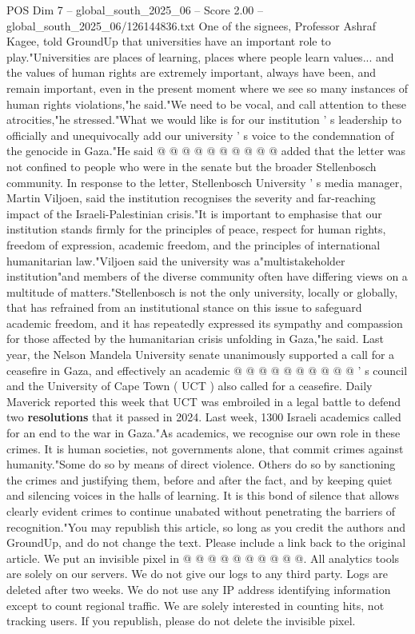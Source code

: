 \begin{textsample}{POS Dim 7 – global\_south\_2025\_06 – Score 2.00 – global\_south\_2025\_06/126144836.txt}
One of the signees, Professor Ashraf Kagee, told GroundUp that universities have an important role to play."Universities are places of learning, places where people learn values... and the values of human rights are extremely important, always have been, and remain important, even in the present moment where we see so many instances of human rights violations,"he said."We need to be vocal, and call attention to these atrocities,"he stressed."What we would like is for our institution ' s leadership to officially and unequivocally add our university ' s voice to the condemnation of the genocide in Gaza."He said @ @ @ @ @ @ @ @ @ @ added that the letter was not confined to people who were in the senate but the broader Stellenbosch community.
In response to the letter, Stellenbosch University ' s media manager, Martin Viljoen, said the institution recognises the severity and far-reaching impact of the Israeli-Palestinian crisis."It is important to emphasise that our institution stands firmly for the principles of peace, respect for human rights, freedom of expression, academic freedom, and the principles of international humanitarian law."Viljoen said the university was a"multistakeholder institution"and members of the diverse community often have differing views on a multitude of matters."Stellenbosch is not the only university, locally or globally, that has refrained from an institutional stance on this issue to safeguard academic freedom, and it has repeatedly expressed its sympathy and compassion for those affected by the humanitarian crisis unfolding in Gaza,"he said.
Last year, the Nelson Mandela University senate unanimously supported a call for a ceasefire in Gaza, and effectively an academic @ @ @ @ @ @ @ @ @ @ ' s council and the University of Cape Town ( UCT ) also called for a ceasefire.
Daily Maverick reported this week that UCT was embroiled in a legal battle to defend two \textbf{resolutions} that it passed in 2024.
Last week, 1300 Israeli academics called for an end to the war in Gaza."As academics, we recognise our own role in these crimes.
It is human societies, not governments alone, that commit crimes against humanity."Some do so by means of direct violence.
Others do so by sanctioning the crimes and justifying them, before and after the fact, and by keeping quiet and silencing voices in the halls of learning.
It is this bond of silence that allows clearly evident crimes to continue unabated without penetrating the barriers of recognition."You may republish this article, so long as you credit the authors and GroundUp, and do not change the text.
Please include a link back to the original article.
We put an invisible pixel in @ @ @ @ @ @ @ @ @ @.
All analytics tools are solely on our servers.
We do not give our logs to any third party.
Logs are deleted after two weeks.
We do not use any IP address identifying information except to count regional traffic.
We are solely interested in counting hits, not tracking users.
If you republish, please do not delete the invisible pixel.

\end{textsample}

